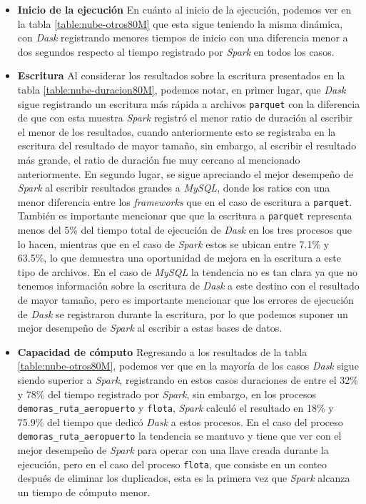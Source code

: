 \begin{itemize}
	\item \textbf{Inicio de la ejecución} En cuánto al inicio de la ejecución, podemos ver en la tabla \ref{table:nube-otros80M} que esta sigue teniendo la misma dinámica, con \textit{Dask} registrando menores tiempos de inicio con una diferencia menor a dos segundos respecto al tiempo registrado por \textit{Spark} en todos los casos.
	
	\item \textbf{Escritura} Al considerar los resultados sobre la escritura presentados en la tabla \ref{table:nube-duracion80M}, podemos notar, en primer lugar, que \textit{Dask} sigue registrando un escritura más rápida a archivos \texttt{parquet} con la diferencia de que con esta muestra \textit{Spark} registró el menor ratio de duración al escribir el menor de los resultados, cuando anteriormente esto se registraba en la escritura del resultado de mayor tamaño, sin embargo, al escribir el resultado más grande, el ratio de duración fue muy cercano al mencionado anteriormente. En segundo lugar, se sigue apreciando el mejor desempeño de \textit{Spark} al escribir resultados grandes a \textit{MySQL}, donde los ratios con una menor diferencia entre los \textit{frameworks} que en el caso de escritura a \texttt{parquet}. También es importante mencionar que que la escritura a \texttt{parquet} representa menos del 5\% del tiempo total de ejecución de \textit{Dask} en los tres procesos que lo hacen, mientras que en el caso de \textit{Spark} estos se ubican entre 7.1\% y 63.5\%, lo que demuestra una oportunidad de mejora en la escritura a este tipo de archivos. En el caso de \textit{MySQL} la tendencia no es tan clara ya que no tenemos información sobre la escritura de \textit{Dask} a este destino con el resultado de mayor tamaño, pero es importante mencionar que los errores de ejecución de \textit{Dask} se registraron durante la escritura, por lo que podemos suponer un mejor desempeño de \textit{Spark} al escribir a estas bases de datos.
	
	\item \textbf{Capacidad de cómputo} Regresando a los resultados de la tabla \ref{table:nube-otros80M}, podemos ver que en la mayoría de los casos \textit{Dask} sigue siendo superior a \textit{Spark}, registrando en estos casos duraciones de entre el 32\% y 78\% del tiempo registrado por \textit{Spark}, sin embargo, en los procesos \texttt{demoras\_ruta\_aeropuerto} y \texttt{flota}, \textit{Spark} calculó el resultado en 18\% y 75.9\% del tiempo que dedicó \textit{Dask} a estos procesos. En el caso del proceso \texttt{demoras\_ruta\_aeropuerto} la tendencia se mantuvo y tiene que ver con el mejor desempeño de \textit{Spark} para operar con una llave creada durante la ejecución, pero en el caso del proceso \texttt{flota}, que consiste en un conteo después de eliminar los duplicados, esta es la primera vez que \textit{Spark} alcanza un tiempo de cómputo menor.
	

\end{itemize}
